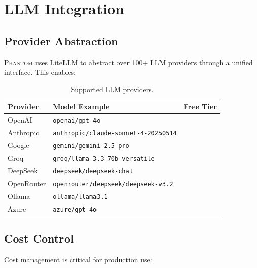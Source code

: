 \documentclass[12pt,a4paper,twoside]{report}
\makeatletter
\newcommand{\phantom@}{\textsc{Phantom}}
\newcommand{\cmark}{\textcolor{phantomgreen}{\ding{51}}}
\newcommand{\xmark}{\textcolor{phantomred}{\ding{55}}}
\makeatother
\begin{document}
\chapter{LLM Integration}
\label{ch:llm}

\section{Provider Abstraction}

\phantom@{} uses \href{https://github.com/BerriAI/litellm}{LiteLLM} to abstract over 100+ LLM providers through a unified interface. This enables:

\begin{table}[H]
\centering
\caption{Supported LLM providers.}
\label{tab:providers}
\begin{tabular}{llc}
\toprule
\textbf{Provider} & \textbf{Model Example} & \textbf{Free Tier} \\
\midrule
OpenAI      & \texttt{openai/gpt-4o}                    & \xmark \\
Anthropic   & \texttt{anthropic/claude-sonnet-4-20250514}           & \xmark \\
Google      & \texttt{gemini/gemini-2.5-pro}             & \cmark \\
Groq        & \texttt{groq/llama-3.3-70b-versatile}      & \cmark \\
DeepSeek    & \texttt{deepseek/deepseek-chat}             & \xmark \\
OpenRouter  & \texttt{openrouter/deepseek/deepseek-v3.2} & \xmark \\
Ollama      & \texttt{ollama/llama3.1}                    & \cmark \\
Azure       & \texttt{azure/gpt-4o}                       & \xmark \\
\bottomrule
\end{tabular}
\end{table}

\section{Cost Control}

Cost management is critical for production use:
\end{document}

